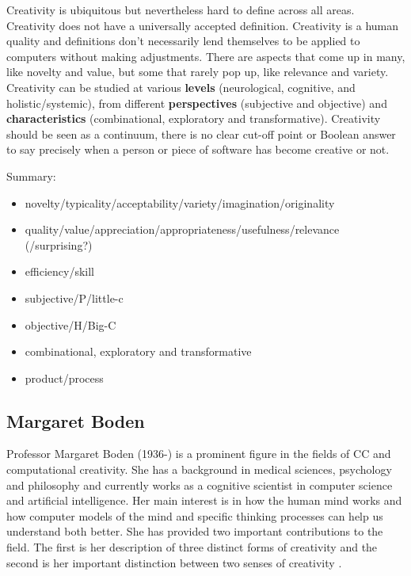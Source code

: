 Creativity is ubiquitous but nevertheless hard to define across all areas.
Creativity does not have a universally accepted definition. Creativity is a human quality and definitions don’t necessarily lend themselves to be applied to computers without making adjustments. There are aspects that come up in many, like novelty and value, but some that rarely pop up, like relevance and variety. Creativity can be studied at various \textbf{levels} (neurological, cognitive, and holistic/systemic), from different \textbf{perspectives} (subjective and objective) and \textbf{characteristics} (combinational, exploratory and transformative). Creativity should be seen as a continuum, there is no clear cut-off point or Boolean answer to say precisely when a person or piece of software has become creative or not.

\begin{shaded}
Summary:\\
\begin{itemize}
\item novelty/typicality/acceptability/variety/imagination/originality
\item quality/value/appreciation/appropriateness/usefulness/relevance (/surprising?)
\item efficiency/skill
\item subjective/P/little-c
\item objective/H/Big-C
\item combinational, exploratory and transformative
\item product/process
\end{itemize}
\end{shaded}

\citep{Berners-Lee1998, Everitt2013, Everitt2012}

\subsection{Margaret Boden}

Professor Margaret Boden (1936-) is a prominent figure in the fields of CC and computational creativity. She has a background in medical sciences, psychology and philosophy and currently works as a cognitive scientist in computer science and artificial intelligence. Her main interest is in how the human mind works and how computer models of the mind and specific thinking processes can help us understand both better. She has provided two important contributions to the field. The first is her description of three distinct forms of creativity and the second is her important distinction between two senses of creativity \citep{Boden2003}.

